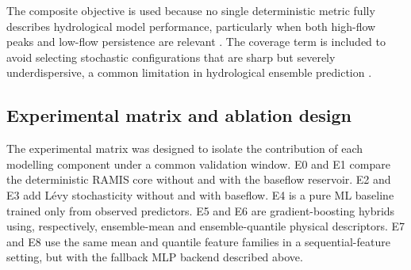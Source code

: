 \documentclass[a4paper,fleqn]{cas-sc}
\begin{document}
The composite objective is used because no single deterministic metric
fully describes hydrological model performance, particularly when both
high-flow peaks and low-flow persistence are relevant
\citep{pushpalatha2012review}. The coverage term is included to avoid
selecting stochastic configurations that are sharp but severely
underdispersive, a common limitation in hydrological ensemble
prediction \citep{franz2011evaluating,abaza2017incidence}.

\subsection{Experimental matrix and ablation design}\label{subsec:matrix}

The experimental matrix was designed to isolate the contribution of each
modelling component under a common validation window. E0 and E1 compare
the deterministic RAMIS core without and with the baseflow reservoir.
E2 and E3 add L\'{e}vy stochasticity without and with baseflow. E4 is a
pure ML baseline trained only from observed predictors. E5 and E6 are
gradient-boosting hybrids using, respectively, ensemble-mean and
ensemble-quantile physical descriptors. E7 and E8 use the same mean and
quantile feature families in a sequential-feature setting, but with the
fallback MLP backend described above.
\end{document}
